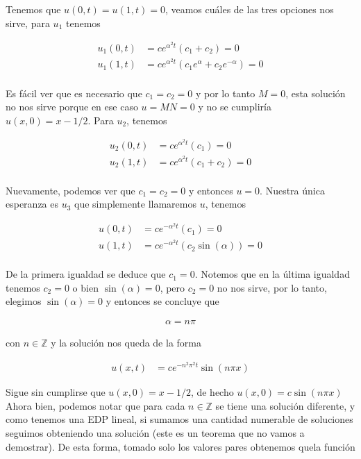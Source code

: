 \documentclass{article}
\theoremstyle{plain}
\theoremstyle{definition}
\begin{document}
Tenemos que $u(0,t)=u(1,t)=0$, veamos cuáles de las tres opciones nos sirve, para $u_1$ tenemos


\begin{align*}
    u_1(0,t) &= ce^{\alpha^2t}(c_1+c_2) =0 \\
    u_1(1,t) &= ce^{\alpha^2t}(c_1e^{\alpha }+c_2e^{-\alpha}) =0\\
\end{align*}

Es fácil ver que es necesario que $c_1=c_2=0$ y por lo tanto $M=0$, esta solución no nos sirve porque en ese caso $u=MN=0$ y no se cumpliría $u(x,0)=x-1/2$. Para $u_2$, tenemos


\begin{align*}
    u_2(0,t) &= ce^{\alpha^2t}(c_1) =0 \\
    u_2(1,t) &= ce^{\alpha^2t}(c_1+c_2) =0\\
\end{align*}

Nuevamente, podemos ver que $c_1=c_2=0$ y entonces $u=0$. Nuestra única esperanza es $u_3$ que simplemente llamaremos $u$, tenemos

\begin{align*}
    u(0,t) &= ce^{-\alpha^2t}(c_1)=0 \\
    u(1,t) &= ce^{-\alpha^2t}(c_2\sin(\alpha)) =0\\
\end{align*}

De la primera igualdad se deduce que $c_1=0$. Notemos que en la última igualdad tenemos $c_2=0$ o bien $\sin(\alpha)=0$, pero $c_2=0$ no nos sirve, por lo tanto, elegimos $\sin(\alpha) =0 $ y entonces se concluye que

\begin{align*}
    \alpha = n \pi
\end{align*}

con $ n\in \mathbb{Z} $ y la solución nos queda de la forma

\begin{align*}
    u(x,t) &= ce^{-n^2\pi^2t}\sin(n\pi x)
\end{align*}

Sigue sin cumplirse que $u(x,0)=x-1/2$, de hecho $u(x,0)=c\sin(n\pi x)$ Ahora bien, podemos notar que para cada $n \in \mathbb{Z}$ se tiene una solución diferente, y como tenemos una EDP lineal, si sumamos una cantidad numerable de soluciones seguimos obteniendo una solución (este es un teorema que no vamos a demostrar). De esta forma, tomado solo los valores pares obtenemos quela función
\end{document}
